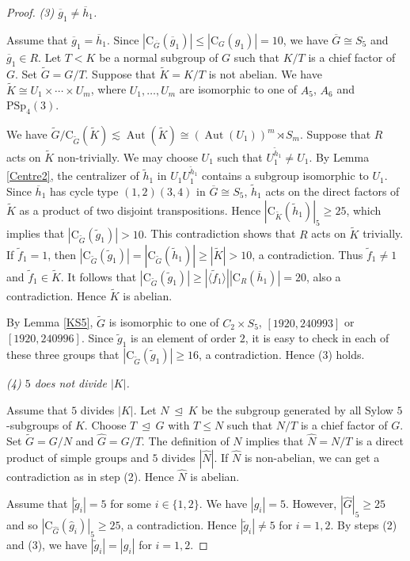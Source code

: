 \documentclass[11pt]{article}
\providecommand{\PSp}{{\mathrm{PSp}}}
\providecommand{\C}{{\mathrm{C}}}
\providecommand{\teq}{{\ \trianglelefteq \ }}
\providecommand{\Aut}{{\operatorname{Aut}}}
\providecommand{\gen}[1]{\langle #1 \rangle} %
\providecommand{\gen}[1]{\langle #1 \rangle} %
\providecommand{\gen}[1]{\langle #1 \rangle} %
\providecommand{\olg}{{\overline{g}}}
\providecommand{\olh}{{\overline{h}}}
\providecommand{\olG}{{\overline{G}}}
\providecommand{\wtf}{{\widetilde{f}}}
\providecommand{\wtg}{{\widetilde{g}}}
\providecommand{\wth}{{\widetilde{h}}}
\providecommand{\wtG}{{\widetilde{G}}}
\providecommand{\wtK}{{\widetilde{K}}}
\providecommand{\whg}{{\widehat{g}}}
\providecommand{\whG}{{\widehat{G}}}
\providecommand{\whN}{{\widehat{N}}}
\begin{document}
\begin{proof}
{\sl  (3) $\overline g_1\neq \overline h_1$. } 

    Assume that $\olg_1 = \olh_1$. 
    Since $|\C_{\olG}(\olg_1)|\leq |\C_G(g_1)|=10$,
    we have $\olG\cong S_5$ and $\olg_1\in R$. 
    Let $T<K$ be a normal subgroup of $G$ such that $K/T$ is a chief factor of $G$.
    Set $\wtG=G/T$.
    Suppose that $\wtK=K/T$ is not abelian.
    We have $\wtK\cong U_1\times \cdots \times U_m$,
    where $U_1, \ldots, U_m$ are isomorphic to one of $A_5$, $A_6$ and $\PSp_4(3)$.

    We have $\wtG/\C_{\wtG}(\wtK)\lesssim \Aut(\wtK) \cong (\Aut(U_1))^m \rtimes S_m$.
    Suppose that $R$ acts on $\wtK$ non-trivially.
    We may choose $U_1$ such that $U_1^{\wth_1}\neq U_1$.
    By Lemma \ref{Centre2}, 
    the centralizer of $\wth_1$ in $U_1U_1^{\wth_1}$ contains a subgroup isomorphic to $U_1$.
    Since $\olh_1$ has cycle type $(1,2)(3,4)$ in $\olG\cong S_5$,
    $\wth_1$ acts on the direct factors of $\wtK$ as a product of two disjoint transpositions.
    Hence $|\C_{\wtK}(\wth_1)|_5\geq 25$,
    which implies that $|\C_{\wtG}(\wtg_1)|>10$.
    This contradiction shows that $R$ acts on $\wtK$ trivially.
    If $\wtf_1=1$, 
    then $|\C_{\wtG}(\wtg_1)|=|\C_{\wtG}(\wth_1)|\geq |\wtK|>10$, a contradiction.
    Thus $\wtf_1 \neq 1$ and $\wtf_1\in \wtK$.
    It follows that $|\C_{\wtG}(\wtg_1)|\geq |\gen{\wtf_1}||\C_R(\olh_1)|=20$, also a contradiction.
    Hence $\wtK$ is abelian.
    
    By Lemma \ref{KS5},
    $\wtG$ is isomorphic to 
    one of $C_2\times S_5$, $[1920, 240993]$ or $[1920, 240996]$.
    Since $\wtg_1$ is an element of order $2$, it is easy to check in each of these
    three groups that $|\C_{\wtG}(\wtg_1)|\geq 16$, a contradiction.   
    Hence (3) holds.

{\sl  (4) $5$ does not divide $|K|$. } 

    Assume that $5$ divides $|K|$. 
    Let $N\teq K$ be the subgroup generated by all Sylow $5$-subgroups of $K$.
    Choose $T\teq G$ with $T\leq N$ such that $N/T$ is a chief factor of $G$.
    Set $\wtG=G/N$ and $\whG=G/T$.
    The definition of $N$ implies that $\whN=N/T$ is a direct product of simple groups and $5$ divides $|\whN|$. 
    If $\whN$ is non-abelian, we can get a contradiction as in step (2).
    Hence $\whN$ is abelian.
    
    Assume that $|\wtg_i|=5$ for some $i\in\{1,2\}$. 
    We have $|\whg_i|=5$. 
    However, $|\whG|_5\geq 25$ and so $|\C_{\whG}(\whg_i)|_5\geq 25$, a contradiction. 
    Hence $|\wtg_i|\neq 5$ for $i=1,2$.
    By steps (2) and (3), we have $|\wtg_i|=|g_i|$ for $i=1,2$.


\end{proof}
\end{document}
